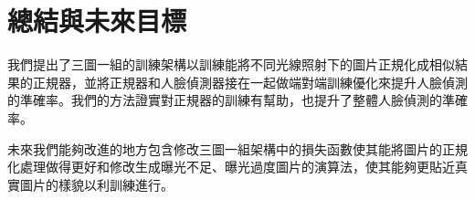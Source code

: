 \chapter{總結與未來目標}
\label{c:conclusion}

我們提出了三圖一組的訓練架構以訓練能將不同光線照射下的圖片正規化成相似結果的正規器，並將正規器和人臉偵測器接在一起做端對端訓練優化來提升人臉偵測的準確率。我們的方法證實對正規器的訓練有幫助，也提升了整體人臉偵測的準確率。

未來我們能夠改進的地方包含修改三圖一組架構中的損失函數使其能將圖片的正規化處理做得更好和修改生成曝光不足、曝光過度圖片的演算法，使其能夠更貼近真實圖片的樣貌以利訓練進行。
